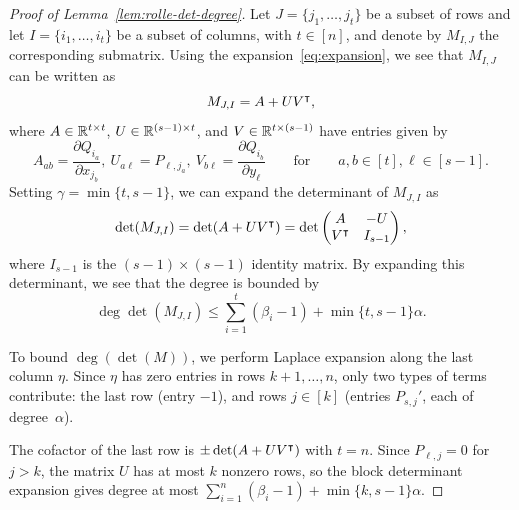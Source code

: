\begin{proof}[Proof of Lemma~\ref{lem:rolle-det-degree}]
Let $J=\{j_1,\dots,j_t\}$ be a subset of rows and let $I=\{i_1,\dots,i_t\}$ be a subset of columns, with $t\in [n]$, and denote by $M_{I,J}$ the corresponding submatrix. Using 
the expansion~\eqref{eq:expansion}, we see that $M_{I,J}$ can 
be written as
\begin{equation*}
  M_{J,I} = A + UV^\intercal,
\end{equation*}
where $A\in \mathbb{R}^{t\times t}$, $U\in \mathbb{R}^{(s-1)\times t}$, and $V\in \mathbb{R}^{t\times (s-1)}$ have entries given by
\begin{equation*}
  A_{ab} = \frac{\partial Q_{i_a}}{\partial x_{j_b}}, \ U_{a\ell} = P_{\ell,j_a}, \ V_{b\ell} = \frac{\partial Q_{i_b}}{\partial y_\ell} \qquad \text{for} \qquad a, b \in [t], \ell \in [s-1].
\end{equation*} 
Setting $\gamma = \min \{t,s-1\}$, we can expand the determinant of $M_{J,I}$ as
\begin{equation*}
 \det(M_{J,I}) = \det(A+UV^\intercal) = \det\begin{pmatrix} A & -U \\ V^{\intercal} & I_{s-1}\end{pmatrix},
\end{equation*}
where $I_{s-1}$ is the $(s-1)\times (s-1)$ identity matrix. By expanding this determinant, we see that the degree is bounded by
\begin{equation}\label{eqn:deg-bound-submatrix}
  \deg \det(M_{J,I})\leq \sum_{i=1}^t (\beta_i-1)+\min\{t,s-1\}\alpha.
\end{equation}

To bound $\deg(\det(M))$, we perform Laplace expansion along the last column $\eta$. Since $\eta$ has zero entries in rows $k+1,\dots,n$, only two types of terms contribute: the last row (entry $-1$), and rows $j\in [k]$ (entries $P_{s,j}'$, each of degree~$\alpha$).

The cofactor of the last row is $\pm\det(A + UV^\intercal)$ with $t = n$. Since $P_{\ell,j} = 0$ for $j > k$, the matrix $U$ has at most $k$ nonzero rows, so the block determinant expansion gives degree at most $\sum_{i=1}^n(\beta_i-1) + \min\{k,s-1\}\alpha$.


\end{proof}
